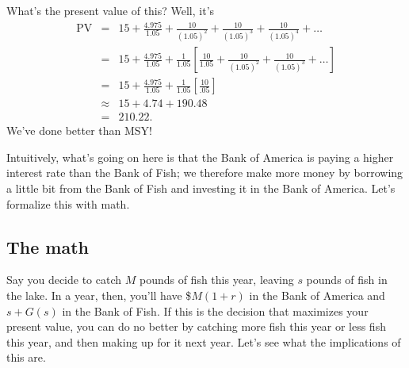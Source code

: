 What's the present value of this? Well, it's
\begin{eqnarray*}
\mbox{PV} & = & 15 + \frac{4.975}{1.05}+\frac{10}{(1.05)^2}+\frac{10}{(1.05)^3}+\frac{10}{(1.05)^4}+\ldots\\
& = & 15 + \frac{4.975}{1.05}+\frac{1}{1.05}\left[\frac{10}{1.05}+\frac{10}{(1.05)^2}+\frac{10}{(1.05)^3}+\ldots \right]\\
& = & 15 + \frac{4.975}{1.05}+\frac{1}{1.05}\left[\frac{10}{.05}\right]\\
& \approx & 15 + 4.74 + 190.48\\
& = & 210.22.
\end{eqnarray*}
We've done better than MSY!

Intuitively, what's going on here is that the Bank of America is paying a higher interest rate than the Bank of Fish; we therefore make more money by borrowing a little bit from the Bank of  Fish and investing it in the Bank of America. Let's formalize this with math.

\subsection*{The math}

Say you decide to catch $M$ pounds of fish this year, leaving $s$ pounds of fish in the lake. In a year, then, you'll have \$$M(1+r)$ in the Bank of America and $s+G(s)$ in the Bank of Fish. If this is the decision that maximizes your present value, you can do no better by catching more fish this year or less fish this year, and then making up for it next year. Let's see what the implications of this are.

